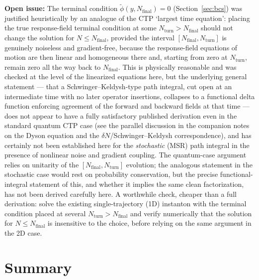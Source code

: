 \documentclass[a4paper,11pt]{article}
\renewcommand{\leq}{\leqslant}
\newenvironment{todo}{\begin{tcolorbox}[enhanced,breakable,colback=SussexBurntOrange!10,colframe=SussexBurntOrange!40]\small{\textsf{\textbf{Open issue:} }}}{\end{tcolorbox}}
\newcommand{\Ny}{N}                          %
\newcommand{\Nfinal}{N_{\mathrm{final}}}     %
\newcommand{\field}{\phi}                    %
\newcommand{\rfield}{\widetilde\field}       %
\newcommand{\yco}{y}                         %
\begin{document}
\begin{todo}
The terminal condition $\rfield(\yco,\Nfinal)=0$ (Section~\ref{sec:bcs})
was justified heuristically by an analogue of the CTP `largest time
equation': placing the true response-field terminal condition at some
$\Ny_{\mathrm{turn}} > \Nfinal$ should not change the solution for
$\Ny \leq \Nfinal$, provided the interval $[\Nfinal,\Ny_{\mathrm{turn}}]$ is
genuinely noiseless and gradient-free, because the response-field
equations of motion are then linear and homogeneous there and, starting
from zero at $\Ny_{\mathrm{turn}}$, remain zero all the way back to
$\Nfinal$. This is physically reasonable and was checked at the level of
the linearized equations here, but the underlying general statement ---
that a Schwinger--Keldysh-type path integral, cut open at an intermediate
time with no later operator insertions, collapses to a functional delta
function enforcing agreement of the forward and backward fields at that
time --- does not appear to have a fully satisfactory published derivation
even in the standard quantum CTP case (see the parallel discussion in the
companion notes on the Dyson equation and the $\delta N$/Schwinger--Keldysh
correspondence), and has certainly not been established here for the
\emph{stochastic} (MSR) path integral in the presence of nonlinear noise
and gradient coupling. The quantum-case argument relies on unitarity of
the $[\Nfinal,\Ny_{\mathrm{turn}}]$ evolution; the analogous statement in
the stochastic case would rest on probability conservation, but the
precise functional-integral statement of this, and whether it implies the
same clean factorization, has not been derived carefully here. A
worthwhile check, cheaper than a full derivation: solve the existing
single-trajectory (1D) instanton with the terminal condition placed at
several $\Ny_{\mathrm{turn}} > \Nfinal$ and verify numerically that the
solution for $\Ny \leq \Nfinal$ is insensitive to the choice, before
relying on the same argument in the 2D case.
\end{todo}

\section{Summary}
\label{sec:summary}
\end{document}

